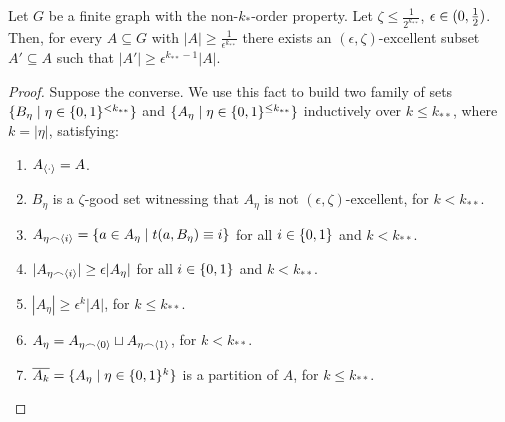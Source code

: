         \begin{lemma} \label{lem:existance_of_excellent_subsets}
            Let $G$ be a finite graph with the non-$k_{*}$-order property.
            Let $\zeta \leq \frac{1}{2^{k_{**}}}$, $\epsilon \in ( 0, \frac{1}{2} )$.
            Then, for every $A \subseteq G$ with $|A| \geq \frac{1}{\epsilon^{k_{**}}}$ there exists an $(\epsilon, \zeta)$-excellent
            subset $A' \subseteq A$ such that $|A'| \geq \epsilon^{k_{**}-1} |A|$.
            \begin{proof}
                Suppose the converse.
                We use this fact to build two family of sets $\{ B_\eta \mid \eta \in \{ 0,1 \}^{<k_{**}} \}$ and
                $\{ A_\eta \mid \eta \in \{ 0,1 \}^{\leq k_{**}} \}$ inductively over $k\leq k_{**}$, where $k = |\eta|$,
                satisfying:
                \begin{enumerate}
                    \item\label{itm:existance_of_excellent_subsets.1} $A_{\left< \cdot \right>} = A$.
                    \item\label{itm:existance_of_excellent_subsets.2} $B_\eta$ is a $\zeta$-good set witnessing that $A_\eta$ is not
                        $(\epsilon, \zeta)$-excellent, for $k < k_{**}$.
                    \item\label{itm:existance_of_excellent_subsets.3} $A_{\eta \frown \left< i \right>} = \{ a \in A_\eta \mid t(a, B_\eta) \equiv i \}$
                        for all $i \in \{ 0,1 \}$ and $k < k_{**}$.
                    \item\label{itm:existance_of_excellent_subsets.4} $| A_{\eta \frown \left< i \right>} | \geq \epsilon |A_\eta|$
                        for all $i \in \{ 0,1 \}$ and $k < k_{**}$.
                    \item\label{itm:existance_of_excellent_subsets.5} $|A_\eta| \geq \epsilon^k |A|$, for $k \leq k_{**}$.
                    \item\label{itm:existance_of_excellent_subsets.6} $A_\eta = A_{\eta \frown \left< 0 \right>} \sqcup A_{\eta \frown \left< 1 \right>}$,
                        for $k < k_{**}$.
                    \item\label{itm:existance_of_excellent_subsets.7} $\overline{A_k} = \{ A_\eta \mid \eta \in \{ 0,1 \}^k \}$ is a partition of $A$,
                        for $k \leq k_{**}$.
                \end{enumerate}

\end{proof}
\end{lemma}
